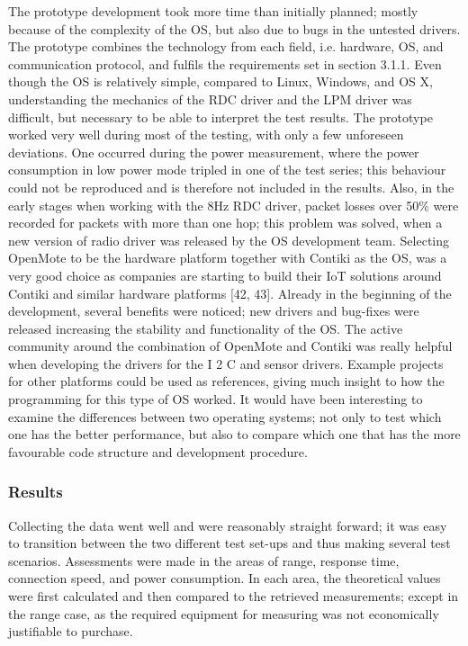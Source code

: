 The prototype development took more time than initially planned;
	mostly because of the complexity of the OS,
	but also due to bugs in the untested drivers.
The prototype combines the technology from each field,
	i.e.
hardware,
	OS,
	and communication protocol,
	and fulfils the requirements set in section 3.1.1.
Even though the OS is relatively simple,
	compared to Linux,
	Windows,
	and OS X,
	understanding the mechanics of the RDC driver and the LPM driver was difficult,
	but necessary to be able to interpret the test results.
The prototype worked very well during most of the testing,
	with only a few unforeseen deviations.
One occurred during the power measurement,
	where the power consumption in low power mode tripled in one of the test series;
	this behaviour could not be reproduced and is therefore not included in the results.
Also,
	in the early stages when working with the 8Hz RDC driver,
	packet losses over 50\% were recorded for packets with more
than one hop;
	this problem was solved,
	when a new version of radio driver was released by the OS development team.
Selecting OpenMote to be the hardware platform together with Contiki as the OS,
	was a very good choice as companies are starting to build their IoT solutions around Contiki and similar hardware platforms [42, 43].
Already in the beginning of the development,
	several benefits were noticed;
	new drivers and bug-fixes were released increasing the stability and functionality of the OS.
The active community around the combination of OpenMote and Contiki was really helpful when developing the drivers for the I 2 C and sensor drivers.
Example projects for other platforms could be used as references,
	giving much insight to how the programming for this type of OS worked.
It would have been interesting to examine the differences between two operating systems;
	not only to test which one has the better performance,
	but also to compare which one that has the more favourable code structure and development procedure.

\subsubsection{Results}
Collecting the data went well and were reasonably straight forward;
	it was easy to transition between the two different test set-ups and thus making several test scenarios.
Assessments were made in the areas of range,
	response time,
	connection speed,
	and power consumption.
In each area,
	the theoretical values were first calculated and then compared to the retrieved measurements;
	except in the range case,
	as the required equipment for measuring was not economically justifiable to purchase.
	
